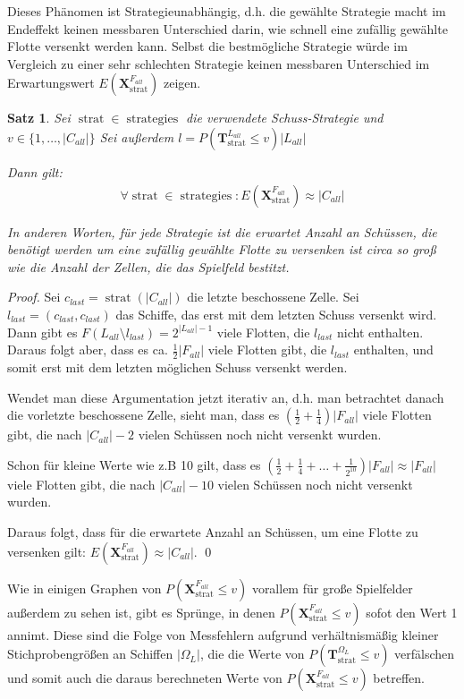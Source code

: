 \documentclass[a4paper,12pt]{llncs}
\numberwithin{equation}{section}
\newtheorem{satz}{Satz}
\DeclareMathOperator{\strat}{strat}
\DeclareMathOperator{\strategies}{strategies}
\begin{document}
Dieses Phänomen ist Strategieunabhängig, d.h. die gewählte Strategie macht im Endeffekt keinen messbaren Unterschied darin, wie schnell eine zufällig gewählte Flotte versenkt werden kann. Selbst die bestmögliche Strategie würde im Vergleich zu einer sehr schlechten Strategie keinen messbaren Unterschied im Erwartungswert $E(\mathbf{X}^{F_{all}}_{\strat})$ zeigen.

\begin{satz}
Sei $\strat \in \strategies$ die verwendete Schuss-Strategie und $v \in \{1, \dots, |C_{all}|\}$
Sei außerdem $l=P(\mathbf{T}^{L_{all}}_{\strat} \leq v) |L_{all}|$

Dann gilt:
\begin{align}
\forall \strat \in \strategies \colon E(\mathbf{X}^{F_{all}}_{\strat}) \approx |C_{all}|
\nonumber
\end{align}

In anderen Worten, für jede Strategie ist die erwartet Anzahl an Schüssen, die benötigt werden um eine zufällig gewählte Flotte zu versenken ist circa so groß wie die Anzahl der Zellen, die das Spielfeld bestitzt.
\end{satz}

\begin{proof}
Sei $c_{last}=\strat(|C_{all}|)$ die letzte beschossene Zelle.
Sei $l_{last}=(c_{last}, c_{last})$ das Schiffe, das erst mit dem letzten Schuss versenkt wird.
Dann gibt es $F(L_{all} \setminus l_{last})=2^{|L_{all}|-1}$ viele Flotten, die $l_{last}$ nicht enthalten.
Daraus folgt aber, dass es ca. $\frac{1}{2} |F_{all}|$ viele Flotten gibt, die $l_{last}$ enthalten, und somit erst mit dem letzten möglichen Schuss versenkt werden.

Wendet man diese Argumentation jetzt iterativ an, d.h. man betrachtet danach die vorletzte beschossene Zelle, sieht man, dass es $(\frac{1}{2} + \frac{1}{4}) |F_{all}|$ viele Flotten gibt, die nach $|C_{all}| - 2$ vielen Schüssen noch nicht versenkt wurden.

Schon für kleine Werte wie z.B 10 gilt, dass es $(\frac{1}{2} + \frac{1}{4} + \dots + \frac{1}{2^{10}}) |F_{all}| \approx |F_{all}|$ viele Flotten gibt, die nach $|C_{all}| - 10$ vielen Schüssen noch nicht versenkt wurden.

Daraus folgt, dass für die erwartete Anzahl an Schüssen, um eine Flotte zu versenken gilt: $E(\mathbf{X}^{F_{all}}_{\strat}) \approx |C_{all}|$.
\qed
\end{proof}

Wie in einigen Graphen von $P(\mathbf{X}^{F_{all}}_{\strat} \leq v)$ vorallem für große Spielfelder außerdem zu sehen ist, gibt es Sprünge, in denen $P(\mathbf{X}^{F_{all}}_{\strat} \leq v)$ sofot den Wert 1 annimt. Diese sind die Folge von Messfehlern aufgrund verhältnismäßig kleiner Stichprobengrößen an Schiffen $|\Omega_L|$, die die Werte von $P(\mathbf{T}^{\Omega_L}_{\strat} \leq v)$ verfälschen und somit auch die daraus berechneten Werte von $P(\mathbf{X}^{F_{all}}_{\strat} \leq v)$ betreffen.
\end{document}
